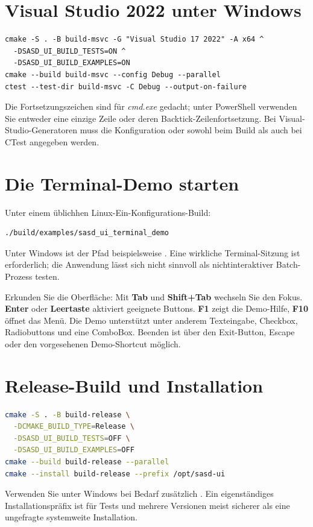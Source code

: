 \section{Visual Studio 2022 unter Windows}
\begin{lstlisting}[language={},caption={Multi-Config-Build mit MSVC}]
cmake -S . -B build-msvc -G "Visual Studio 17 2022" -A x64 ^
  -DSASD_UI_BUILD_TESTS=ON ^
  -DSASD_UI_BUILD_EXAMPLES=ON
cmake --build build-msvc --config Debug --parallel
ctest --test-dir build-msvc -C Debug --output-on-failure
\end{lstlisting}
Die Fortsetzungszeichen \texttt{} sind für \emph{cmd.exe}
gedacht; unter PowerShell verwenden Sie entweder eine einzige Zeile
oder deren Backtick-Zeilenfortsetzung. Bei Visual-Studio-Generatoren
muss die Konfiguration  oder 
sowohl beim Build als auch bei CTest angegeben werden.

\section{Die Terminal-Demo starten}
Unter einem üblichhen Linux-Ein-Konfigurations-Build:
\begin{lstlisting}[language=bash]
./build/examples/sasd_ui_terminal_demo
\end{lstlisting}
Unter Windows ist der Pfad beispielsweise
.
Eine wirkliche Terminal-Sitzung ist erforderlich; die Anwendung
lässt sich nicht sinnvoll als nichtinteraktiver Batch-Prozess testen.

Erkunden Sie die Oberfläche: Mit \textbf{Tab} und
\textbf{Shift+Tab} wechseln Sie den Fokus. \textbf{Enter}
oder \textbf{Leertaste} aktiviert geeignete Buttons.
\textbf{F1} zeigt die Demo-Hilfe, \textbf{F10} öffnet das Menü.
Die Demo unterstützt unter anderem Texteingabe, Checkbox,
Radiobuttons und eine ComboBox. Beenden ist über den Exit-Button,
Escape oder den vorgesehenen Demo-Shortcut möglich.


\section{Release-Build und Installation}
\begin{lstlisting}[language=bash,caption={Installation in ein gewähltes Präfix}]
cmake -S . -B build-release \
  -DCMAKE_BUILD_TYPE=Release \
  -DSASD_UI_BUILD_TESTS=OFF \
  -DSASD_UI_BUILD_EXAMPLES=OFF
cmake --build build-release --parallel
cmake --install build-release --prefix /opt/sasd-ui
\end{lstlisting}
Verwenden Sie unter Windows bei Bedarf zusätzlich
\filepath{--config Release}. Ein eigenständiges Installationspräfix
ist für Tests und mehrere Versionen meist sicherer als eine
ungefragte systemweite Installation.

